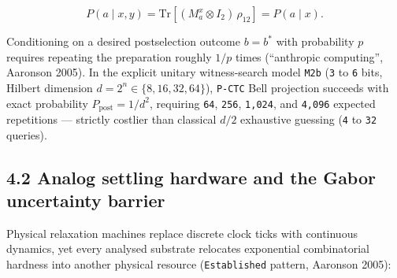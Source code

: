 \documentclass[10pt,letterpaper]{article}
\begin{document}
\[P(a \mid x, y) = \mathrm{Tr}\!\left[(M_a^x \otimes I_2)\,\rho_{12}\right] = P(a \mid x).\]

Conditioning on a desired postselection outcome \(b = b^*\) with
probability \(p\) requires repeating the preparation roughly \(1/p\)
times (``anthropic computing'', Aaronson 2005). In the explicit unitary
witness-search model \texttt{M2b} (\texttt{3} to \texttt{6} bits,
Hilbert dimension \(d = 2^n \in \{8, 16, 32, 64\}\)), \texttt{P-CTC}
Bell projection succeeds with exact probability
\(P_{\text{post}} = 1/d^2\), requiring \texttt{64}, \texttt{256},
\texttt{1,024}, and \texttt{4,096} expected repetitions --- strictly
costlier than classical \(d/2\) exhaustive guessing (\texttt{4} to
\texttt{32} queries).

\subsection{4.2 Analog settling hardware and the Gabor uncertainty
barrier}\label{analog-settling-hardware-and-the-gabor-uncertainty-barrier}

Physical relaxation machines replace discrete clock ticks with
continuous dynamics, yet every analysed substrate relocates exponential
combinatorial hardness into another physical resource
(\texttt{Established} pattern, Aaronson 2005):
\end{document}
